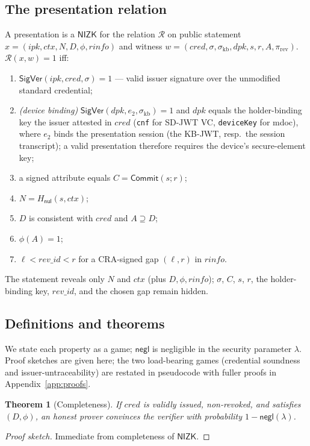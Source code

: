\documentclass[11pt]{article}
\theoremstyle{plain}
\newtheorem{theorem}{Theorem}
\theoremstyle{definition}
\begin{document}
\subsection{The presentation relation}\label{sec:relation}
A presentation is a $\mathsf{NIZK}$ for the relation $\mathcal{R}$ on public statement
$x=(\mathit{ipk},\mathit{ctx},N,D,\phi,\mathit{rinfo})$ and witness
$w=(\mathit{cred},\sigma,\sigma_{\mathrm{kb}},\mathit{dpk},s,r,A,\pi_{\mathrm{rev}})$.
$\mathcal{R}(x,w)=1$ iff:
\begin{enumerate}
\item $\mathsf{SigVer}(\mathit{ipk},\mathit{cred},\sigma)=1$ --- valid issuer signature
over the unmodified standard credential;
\item \emph{(device binding)} $\mathsf{SigVer}(\mathit{dpk},e_2,\sigma_{\mathrm{kb}})=1$
and $\mathit{dpk}$ equals the holder-binding key the issuer attested in $\mathit{cred}$
(\texttt{cnf} for SD-JWT VC, \texttt{deviceKey} for mdoc), where $e_2$ binds the
presentation session (the KB-JWT, resp.\ the session transcript); a valid presentation
therefore requires the device's secure-element key;
\item a signed attribute equals $C=\mathsf{Commit}(s;r)$;
\item $N=H_{\mathsf{nul}}(s,\mathit{ctx})$;
\item $D$ is consistent with $\mathit{cred}$ and $A\supseteq D$;
\item $\phi(A)=1$;
\item $\ell<\mathit{rev\_id}<r$ for a CRA-signed gap $(\ell,r)$ in $\mathit{rinfo}$.
\end{enumerate}
The statement reveals only $N$ and $\mathit{ctx}$ (plus $D,\phi,\mathit{rinfo}$);
$\sigma$, $C$, $s$, $r$, the holder-binding key, $\mathit{rev\_id}$, and the chosen gap
remain hidden.

\subsection{Definitions and theorems}
We state each property as a game; $\mathsf{negl}$ is negligible in the security
parameter $\lambda$. Proof sketches are given here; the two load-bearing games
(credential soundness and issuer-untraceability) are restated in pseudocode with
fuller proofs in Appendix~\ref{app:proofs}.

\begin{theorem}[Completeness]\label{thm:complete}
If $\mathit{cred}$ is validly issued, non-revoked, and satisfies $(D,\phi)$, an honest
prover convinces the verifier with probability $1-\mathsf{negl}(\lambda)$.
\end{theorem}
\begin{proof}[Proof sketch] Immediate from completeness of $\mathsf{NIZK}$. \end{proof}
\end{document}
